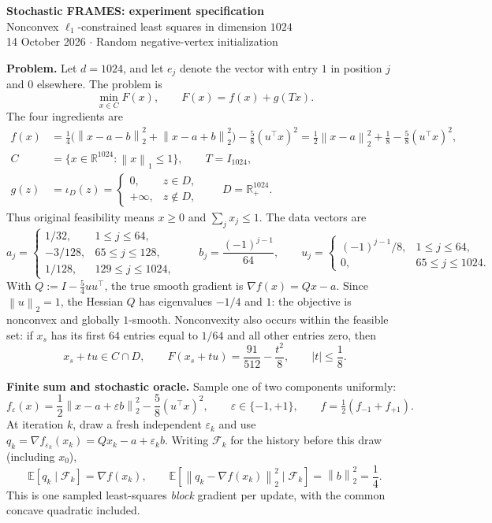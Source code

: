 \documentclass[10pt,a4paper]{article}
\newcommand{\R}{\mathbb R}
\newcommand{\E}{\mathbb E}
\newcommand{\norm}[1]{\left\|#1\right\|}
\begin{document}
\begin{center}
{\Large\bfseries Stochastic FRAMES: experiment specification}\\[4pt]
{\large Nonconvex $\ell_1$-constrained least squares in dimension $1024$}\\[3pt]
14 October 2026 \quad $\cdot$ \quad Random negative-vertex initialization
\end{center}

\textbf{Problem.} Let $d=1024$, and let $e_j$ denote the vector with entry $1$ in position $j$
and $0$ elsewhere. The problem is
\[
\boxed{\min_{x\in C} F(x),\qquad F(x)=f(x)+g(Tx).}
\]
The four ingredients are
\begin{align*}
f(x)&=\frac14\bigl(\norm{x-a-b}_2^2+\norm{x-a+b}_2^2\bigr)
       -\frac58(u^\top x)^2
       =\frac12\norm{x-a}_2^2+\frac18-\frac58(u^\top x)^2,\\
C&=\{x\in\R^{1024}:\norm{x}_1\le1\},\qquad T=I_{1024},\\
g(z)&=\iota_D(z)=\begin{cases}0,&z\in D,\\+\infty,&z\notin D,\end{cases}
\qquad D=\R_+^{1024}.
\end{align*}
Thus original feasibility means $x\ge0$ and $\sum_j x_j\le1$. The data vectors are
\[
a_j=\begin{cases}
1/32,&1\le j\le64,\\
-3/128,&65\le j\le128,\\
1/128,&129\le j\le1024,
\end{cases}
\qquad
b_j=\frac{(-1)^{j-1}}{64},
\qquad
u_j=\begin{cases}
(-1)^{j-1}/8,&1\le j\le64,\\
0,&65\le j\le1024.
\end{cases}
\]
With $Q:=I-\frac54uu^\top$, the true smooth gradient is $\nabla f(x)=Qx-a$.
Since $\norm{u}_2=1$, the Hessian $Q$ has eigenvalues $-1/4$ and $1$: the objective is
nonconvex and globally $1$-smooth. Nonconvexity also occurs within the feasible set:
if $x_s$ has its first $64$ entries equal to $1/64$ and all other entries zero, then
\[
x_s+tu\in C\cap D,\qquad F(x_s+tu)=\frac{91}{512}-\frac{t^2}{8},
\qquad |t|\le\frac18.
\]

\textbf{Finite sum and stochastic oracle.} Sample one of two components uniformly:
\[
f_\varepsilon(x)=\frac12\norm{x-a+\varepsilon b}_2^2-\frac58(u^\top x)^2,
\qquad \varepsilon\in\{-1,+1\},\qquad f=\tfrac12(f_{-1}+f_{+1}).
\]
At iteration $k$, draw a fresh independent $\varepsilon_k$ and use
$q_k=\nabla f_{\varepsilon_k}(x_k)=Qx_k-a+\varepsilon_k b$.
Writing $\mathcal F_k$ for the history before this draw (including $x_0$),
\[
\E[q_k\mid\mathcal F_k]=\nabla f(x_k),\qquad
\E[\norm{q_k-\nabla f(x_k)}_2^2\mid\mathcal F_k]=\norm{b}_2^2=\frac14.
\]
This is one sampled least-squares \emph{block} gradient per update, with the common
concave quadratic included.
\end{document}
